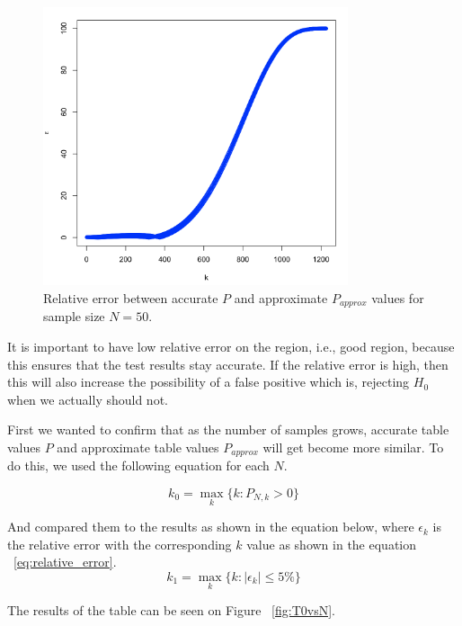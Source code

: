 \documentclass[12pt]{article}
\begin{document}
{\begin{figure}[H]
  \centering
  \includegraphics[width=0.8\textwidth]{approximate_accurate_epsilon}
  \caption{Relative error between accurate $P$ and approximate $P_{approx}$ values for sample size $N=50$.}
  \label{fig:epsilon_difference}
\end{figure}

It is important to have low relative error on the region, i.e., good region, because this ensures that the test results stay accurate. If the relative error is high, then this will also increase the possibility of a false positive which is, rejecting $H_0$ when we actually should not.

First we wanted to confirm that as the number of samples grows, accurate table values $P$ and approximate table values $P_{approx}$ will get become more similar. To do this, we used the following equation for each $N$.

\begin{equation}
  k_0 = \max_k \{ k: P_{N, k} > 0 \}
\end{equation}

And compared them to the results as shown in the equation below, where $\epsilon_k$ is the relative error with the corresponding $k$ value as shown in the equation ~\eqref{eq:relative_error}.
\begin{equation}
  k_1 = \max_k \{ k: |\epsilon_k| \leq 5\% \}
\end{equation}

The results of the table can be seen on Figure ~\ref{fig:T0vsN}.

}
\end{document}
